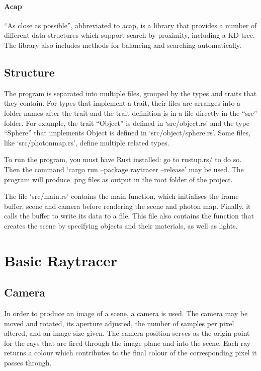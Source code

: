 \documentclass[a4paper]{article}
\begin{document}
\paragraph{Acap} ``As close as possible'', abbreviated to acap, is a library that provides a number of different data structures which support search by proximity, including a KD tree. The library also includes methods for balancing and searching automatically.

\subsection{Structure}
The program is separated into multiple files, grouped by the types and traits that they contain. For types that implement a trait, their files are arranges into a folder names after the trait and the trait definition is in a file directly in the ``src'' folder. For example, the trait ``Object'' is defined in `src/object.rs' and the type ``Sphere'' that implements Object is defined in `src/object/sphere.rs'. Some files, like `src/photonmap.rs', define multiple related types.

To run the program, you must have Rust installed: go to rustup.rs/ to do so. Then the command `cargo run --package raytracer --release' may be used. The program will produce .png files as output in the root folder of the project.

The file `src/main.rs' contains the main function, which initialises the frame buffer, scene and camera before rendering the scene and photon map. Finally, it calls the buffer to write its data to a file. This file also contains the function that creates the scene by specifying objects and their materials, as well as lights.

\section{Basic Raytracer}
\subsection{Camera}
In order to produce an image of a scene, a camera is used. The camera may be moved and rotated, its aperture adjusted, the number of samples per pixel altered, and an image size given. The camera position serves as the origin point for the rays that are fired through the image plane and into the scene. Each ray returns a colour which contributes to the final colour of the corresponding pixel it passes through.
\end{document}
